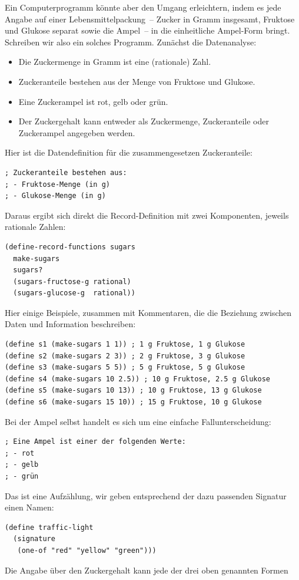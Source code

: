 Ein Computerprogramm könnte aber den Umgang erleichtern, indem es jede
Angabe auf einer Lebensmittelpackung~-- Zucker in Gramm insgesamt,
Fruktose und Glukose separat sowie die Ampel~-- in die einheitliche
Ampel-Form bringt.  Schreiben wir also ein solches Programm.  Zunächst
die Datenanalyse:
%
\begin{itemize}
\item Die Zuckermenge in Gramm ist eine (rationale) Zahl.
\item Zuckeranteile bestehen aus der Menge von Fruktose und Glukose.
\item Eine Zuckerampel ist rot, gelb oder grün.
\item Der Zuckergehalt kann entweder als Zuckermenge, Zuckeranteile
  oder Zuckerampel angegeben werden.
\end{itemize}
%
Hier ist die Datendefinition für die zusammengesetzen Zuckeranteile:
%
\begin{verbatim}
; Zuckeranteile bestehen aus:
; - Fruktose-Menge (in g)
; - Glukose-Menge (in g)
\end{verbatim}
%
Daraus ergibt sich direkt die Record-Definition mit zwei Komponenten,
jeweils rationale Zahlen:
%
\begin{verbatim}
(define-record-functions sugars
  make-sugars
  sugars?
  (sugars-fructose-g rational)
  (sugars-glucose-g  rational))
\end{verbatim}
%
Hier einige Beispiele, zusammen mit Kommentaren, die die Beziehung
zwischen Daten und Information beschreiben:
%
\begin{verbatim}
(define s1 (make-sugars 1 1)) ; 1 g Fruktose, 1 g Glukose
(define s2 (make-sugars 2 3)) ; 2 g Fruktose, 3 g Glukose
(define s3 (make-sugars 5 5)) ; 5 g Fruktose, 5 g Glukose
(define s4 (make-sugars 10 2.5)) ; 10 g Fruktose, 2.5 g Glukose
(define s5 (make-sugars 10 13)) ; 10 g Fruktose, 13 g Glukose
(define s6 (make-sugars 15 10)) ; 15 g Fruktose, 10 g Glukose
\end{verbatim}
%
Bei der Ampel selbst handelt es sich um eine einfache
Fallunterscheidung:
%
\begin{verbatim}
; Eine Ampel ist einer der folgenden Werte:
; - rot
; - gelb
; - grün
\end{verbatim}
%
Das ist eine Aufzählung, wir geben entsprechend der dazu passenden
Signatur einen Namen:
%
\begin{verbatim}
(define traffic-light
  (signature
   (one-of "red" "yellow" "green")))
\end{verbatim}
%
Die Angabe über den Zuckergehalt kann jede der drei oben genannten Formen
